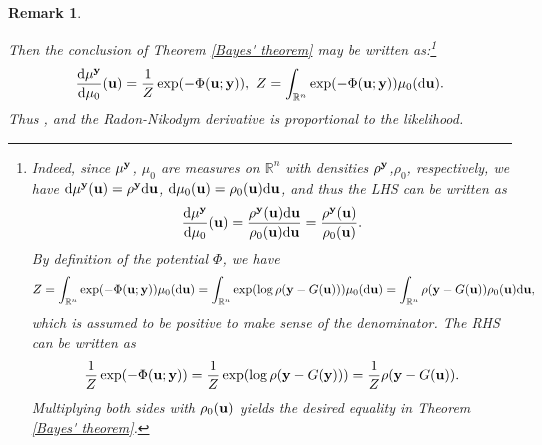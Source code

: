 \documentclass[oneside,11pt]{book}
\numberwithin{equation}{section}
\newtheorem{remark}{Remark}[section]
\begin{document}
\begin{remark}
\begin{itemize}
        Then the conclusion of Theorem \ref{Bayes' theorem} may be written as:\footnote{Indeed, since $\mu^{\bf y}$, $\mu_0$ are measures on $\mathbb{R}^n$ with densities $\rho^{\bf y}$,$ \rho_0$, respectively, we have ${\rm d}\mu^{\bf y}({\bf u}) = \rho^{\bf y}{\rm d}{\bf u}$, ${\rm d}\mu_0({\bf u}) = \rho_0({\bf u}){\rm d}{\bf u}$, and thus the LHS can be written as
        \begin{align*}
            \frac{{\rm d}\mu^{\bf y}}{{\rm d}\mu_0}({\bf u}) = \frac{\rho^{\bf y}({\bf u}){\rm d}{\bf u}}{\rho_0({\bf u}){\rm d}{\bf u}} = \frac{\rho^{\bf y}({\bf u})}{\rho_0({\bf u})}.
        \end{align*}
        By definition of the potential $\Phi$, we have
        \begin{align*}
            Z = \int_{\mathbb{R}^n} \exp(-\Phi({\bf u};{\bf y}))\mu_0({\rm d}{\bf u}) = \int_{\mathbb{R}^n} \exp(\log\rho({\bf y} - G({\bf u})))\mu_0({\rm d}{\bf u}) = \int_{\mathbb{R}^n} \rho({\bf y} - G({\bf u}))\rho_0({\bf u}){\rm d}{\bf u},
        \end{align*}
        which is assumed to be positive to make sense of the denominator. The RHS can be written as
        \begin{align*}
            \frac{1}{Z}\exp(-\Phi({\bf u};{\bf y})) = \frac{1}{Z}\exp(\log\rho({\bf y} - G({\bf y}))) = \frac{1}{Z}\rho({\bf y} - G({\bf u})).
        \end{align*}
        Multiplying both sides with $\rho_0({\bf u})$ yields the desired equality in Theorem \ref{Bayes' theorem}.}
        \begin{align*}
            \frac{{\rm d}\mu^{\bf y}}{{\rm d}\mu_0}({\bf u}) = \frac{1}{Z}\exp(-\Phi({\bf u};{\bf y})),\ Z = \int_{\mathbb{R}^n} \exp(-\Phi({\bf u};{\bf y}))\mu_0({\rm d}{\bf u}).
        \end{align*}
        Thus , and \emph{the Radon-Nikodym derivative is proportional to the likelihood}.
        

\end{itemize}
\end{remark}
\end{document}
